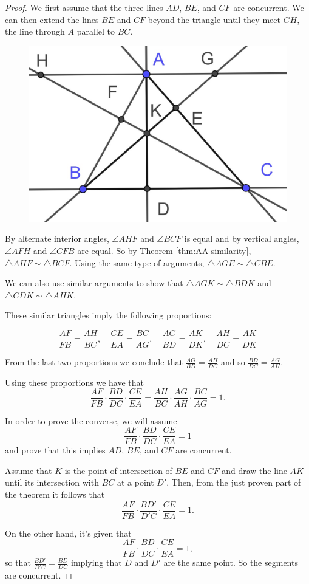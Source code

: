 \documentclass[
]{book}
\theoremstyle{definition}
\theoremstyle{definition}
\theoremstyle{definition}
\theoremstyle{definition}
\theoremstyle{remark}
\begin{document}
\begin{proof}

We first assume that the three lines \(AD\), \(BE\), and \(CF\) are concurrent. We can then extend the lines \(BE\) and \(CF\) beyond the triangle until they meet \(GH\), the line through \(A\) parallel to \(BC\).

\begin{figure}

{\centering \includegraphics[width=0.3\linewidth]{images/Ceva1} 

}

\end{figure}

By alternate interior angles, \(\angle AHF\) and \(\angle BCF\) is equal and by vertical angles, \(\angle AFH\) and \(\angle CFB\) are equal. So by Theorem \ref{thm:AA-similarity}, \(\triangle AHF \sim \triangle BCF\). Using the same type of arguments, \(\triangle AGE \sim \triangle CBE\).

We can also use similar arguments to show that \(\triangle AGK \sim \triangle BDK\) and \(\triangle CDK \sim \triangle AHK\).

These similar triangles imply the following proportions:

\[ \frac{AF}{FB} = \frac{AH}{BC}, \quad \frac{CE}{EA} = \frac{BC}{AG}, \quad \frac{AG}{BD} = \frac{AK}{DK}, \quad \frac{AH}{DC}=\frac{AK}{DK}\]

From the last two proportions we conclude that \(\frac{AG}{BD} = \frac{AH}{DC}\) and so \(\frac{BD}{DC} = \frac{AG}{AH}\).

Using these proportions we have that \[\frac{AF}{FB} \cdot \frac{BD}{DC} \cdot \frac{CE}{EA} = \frac{AH}{BC} \cdot \frac{AG}{AH} \cdot \frac{BC}{AG} = 1.\]

In order to prove the converse, we will assume \[\frac{AF}{FB} \cdot \frac{BD}{DC} \cdot \frac{CE}{EA} = 1\] and prove that this implies \(AD\), \(BE\), and \(CF\) are concurrent.

Assume that \(K\) is the point of intersection of \(BE\) and \(CF\) and draw the line \(AK\) until its intersection with \(BC\) at a point \(D'\). Then, from the just proven part of the theorem it follows that \[\frac{AF}{FB} \cdot \frac{BD'}{D'C} \cdot \frac{CE}{EA} = 1.\]

On the other hand, it's given that \[\frac{AF}{FB} \cdot \frac{BD}{DC} \cdot \frac{CE}{EA} = 1,\]
so that \(\frac{BD'}{D'C} = \frac{BD}{DC}\) implying that \(D\) and \(D'\) are the same point. So the segments are concurrent.

\end{proof}
\end{document}
